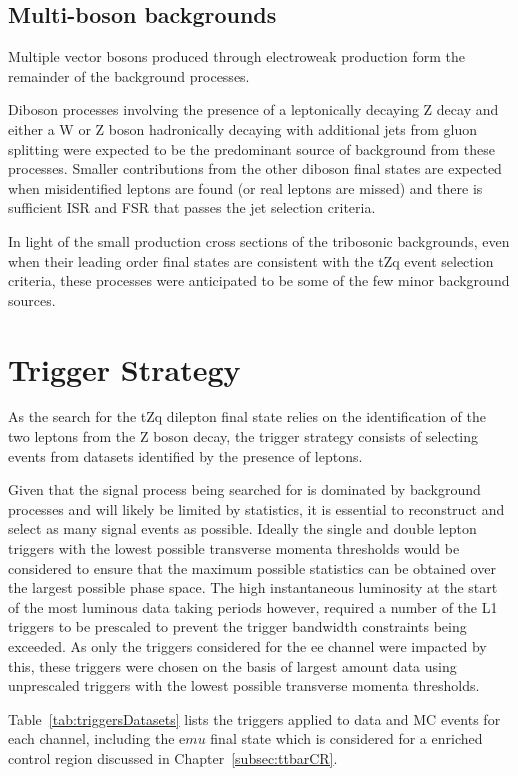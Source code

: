 \subsection{Multi-boson backgrounds}
Multiple vector bosons produced through electroweak production form the remainder of the background processes.

Diboson processes involving the presence of a leptonically decaying Z decay and either a W or Z boson hadronically decaying with additional jets from gluon splitting were expected to be the predominant source of background from these processes.
Smaller contributions from the other diboson final states are expected when misidentified leptons are found (or real leptons are missed) and there is sufficient ISR and FSR that passes the jet selection criteria.

In light of the small production cross sections of the tribosonic backgrounds, even when their leading order final states are consistent with the tZq event selection criteria, these processes were anticipated to be some of the few minor background sources.

\section{Trigger Strategy}\label{sec:triggerStrategy}
As the search for the tZq dilepton final state relies on the identification of the two leptons from the Z boson decay, the trigger strategy consists of selecting events from datasets identified by the presence of leptons.


Given that the signal process being searched for is dominated by background processes and will likely be limited by statistics, it is essential to reconstruct and select as many signal events as possible.
Ideally the single and double lepton triggers with the lowest possible transverse momenta thresholds would be considered to ensure that the maximum possible statistics can be obtained over the largest possible phase space.
The high instantaneous luminosity at the start of the most luminous data taking periods however, required a number of the L1 triggers to be prescaled to prevent the trigger bandwidth constraints being exceeded.
As only the triggers considered for the ee channel were impacted by this, these triggers were chosen on the basis of largest amount data using unprescaled triggers with the lowest possible transverse momenta thresholds.

Table~\ref{tab:triggersDatasets} lists the triggers applied to data and MC events for each channel, including the e$mu$ final state which is considered for a \ttbar enriched control region discussed in Chapter~\ref{subsec:ttbarCR}.

